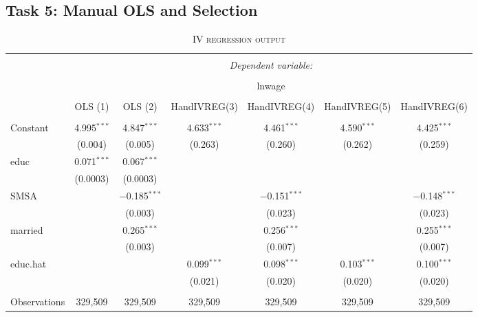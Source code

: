 \documentclass[a4paper]{article}
\begin{document}
\subsection{Task 5: Manual OLS and Selection}

\begin{table}[!htbp] \centering 
\begin{adjustwidth}{0.cm}{-0cm}
\begin{threeparttable}
\small
\captionsetup{font=small, justification=raggedright,singlelinecheck=false}
\caption{\textsc{IV regression output}}
\centering 
  \label{}
\small 
\begin{tabular}{@{\extracolsep{-5pt}}lcccccc} 
\\[-5.8ex]\hline 
\hline \\[-1.8ex] 
 & \multicolumn{6}{c}{\textit{Dependent variable:}} \\ 
\cline{2-7} 
\\[-1.8ex] & \multicolumn{6}{c}{lnwage} \\ 
\\[-1.8ex] & OLS (1) & OLS (2) & HandIVREG(3) & HandIVREG(4) & HandIVREG(5) & HandIVREG(6)\\ 
\hline \\[-1.8ex] 
 Constant & 4.995$^{***}$ & 4.847$^{***}$ & 4.633$^{***}$ & 4.461$^{***}$ & 4.590$^{***}$ & 4.425$^{***}$ \\ 
  & (0.004) & (0.005) & (0.263) & (0.260) & (0.262) & (0.259) \\ 
  educ & 0.071$^{***}$ & 0.067$^{***}$ &  &  &  &  \\ 
  & (0.0003) & (0.0003) &  &  &  &  \\ 
  SMSA &  & $-$0.185$^{***}$ &  & $-$0.151$^{***}$ &  & $-$0.148$^{***}$ \\ 
  &  & (0.003) &  & (0.023) &  & (0.023) \\ 
  married &  & 0.265$^{***}$ &  & 0.256$^{***}$ &  & 0.255$^{***}$ \\ 
  &  & (0.003) &  & (0.007) &  & (0.007) \\ 
  educ.hat &  &  & 0.099$^{***}$ & 0.098$^{***}$ & 0.103$^{***}$ & 0.100$^{***}$ \\ 
  &  &  & (0.021) & (0.020) & (0.020) & (0.020) \\ 
 \hline \\[-1.8ex] 
Observations & 329,509 & 329,509 & 329,509 & 329,509 & 329,509 & 329,509 \\ 

\end{tabular}
\end{threeparttable}
\end{adjustwidth}
\end{table}
\end{document}
